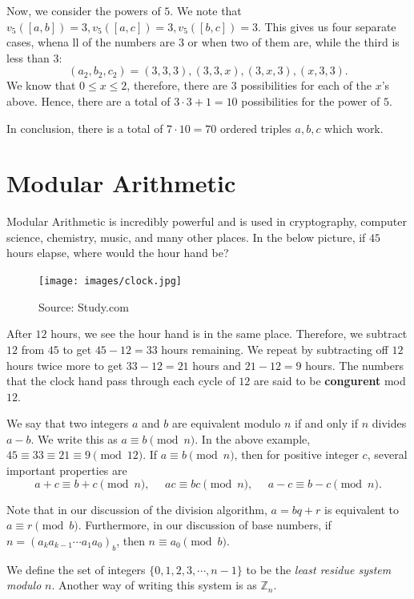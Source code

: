 Now, we consider the powers of $5$. We note that $v_5([a,b])=3, v_5([a,c])=3, v_5([b,c])=3$. This gives us four separate cases, whena ll of the numbers are $3$ or when two of them are, while the third is less than $3$: $$(a_2, b_2, c_2)=(3,3,3), (3,3,x), (3,x, 3), (x,3,3).$$ We know that $0\le x\le 2$, therefore, there are $3$ possibilities for each of the $x$'s above. Hence, there are a total of $3\cdot 3+1=10$ possibilities for the power of $5$.

In conclusion, there is a total of $7\cdot 10=\boxed{70}$ ordered triples $a,b,c$ which work.  
\clearpage

\section{Modular Arithmetic}

Modular Arithmetic is incredibly powerful and is used in cryptography, computer science, chemistry, music, and many other places. In the below picture, if $45$ hours elapse, where would the hour hand be?

\begin{figure}[h]
	\centering\texttt{[image: images/clock.jpg]}
	\caption{Source: Study.com}
\end{figure}

\clearpage
After $12$ hours, we see the hour hand is in the same place. Therefore, we subtract $12$ from $45$ to get $45-12=33$ hours remaining. We repeat by subtracting off $12$ hours twice more to get $33-12=21$ hours and $21-12=\boxed{9}$ hours. The numbers that the clock hand pass through each cycle of $12$ are said to be \textbf{congurent} mod $12$.
\begin{defi} We say that two integers $a$ and $b$ are equivalent modulo $n$ if and only if $n$ divides $a-b$. We write this as $a\equiv b\pmod{n}$. In the above example, $45\equiv 33\equiv 21\equiv 9\pmod{12}$. If $a\equiv b\pmod{n}$, then for positive integer $c$, several important properties are $$a+c\equiv b+c\pmod{n}, \: \:\:  \:\: \: ac\equiv bc\pmod{n}, \:\: \:  \:\:\: a-c\equiv b-c\pmod{n}.$$ 
 \end{defi} 
\clearpage


Note that in our discussion of the \color{blue}division algorithm\color{black}, $a=bq+r$ is equivalent to $a\equiv r\pmod{b}$. Furthermore, in our discussion of \color{blue} base numbers\color{black}, if $n=\left(a_ka_{k-1}\cdots a_1a_0\right)_b$, then $n\equiv a_0\pmod{b}$. 

\begin{defi} We define the set of integers $\{0, 1, 2, 3, \cdots, n-1\}$ to be the \textit{least residue system modulo} $n$. Another way of writing this system is as $\mathbb{Z}_{n}$. \end{defi} 

